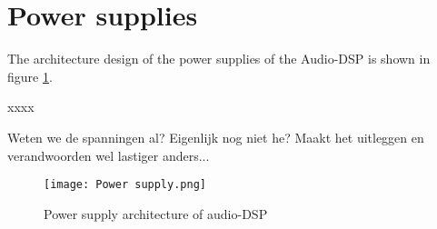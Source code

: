 \section{Power supplies}
The architecture design of the power supplies of the Audio-DSP is shown in figure \ref{fig:arch-power-supply}.

xxxx

Weten we de spanningen al? Eigenlijk nog niet he? Maakt het uitleggen en verandwoorden wel lastiger anders...

\begin{figure}[ht]
    \texttt{[image: Power supply.png]}\\    
    \caption{Power supply architecture of audio-DSP}
    \label{fig:arch-power-supply}
\end{figure}